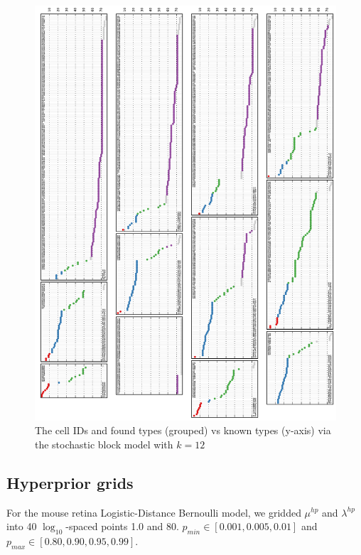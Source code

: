 \documentclass{article}
\begin{document}
\begin{figure}[h!]

  \centering 
    \centerline{\includegraphics[width=6.0in]{mouseretina/retina.1.2.bb.0.0.data-fixed_20_12-anneal_slow_fixed_400.truth_latent.pdf}}
  \caption{The cell IDs and found types (grouped) vs known types (y-axis) via the stochastic block model with $k=12$}
\label{fig:supp:retinabbfixedclusters}
\end{figure}


\newpage

\FloatBarrier
\subsection{Hyperprior grids}
\label{supp:hyperpriors}

For the mouse retina Logistic-Distance Bernoulli model, we gridded $\mu^{hp}$ and $\lambda^{hp}$ into 40 $\log_{10}$-spaced points 1.0 and 80. $p_{min} \in [0.001, 0.005, 0.01]$ and $p_{max} \in [0.80, 0.90, 0.95, 0.99]$.
\end{document}
